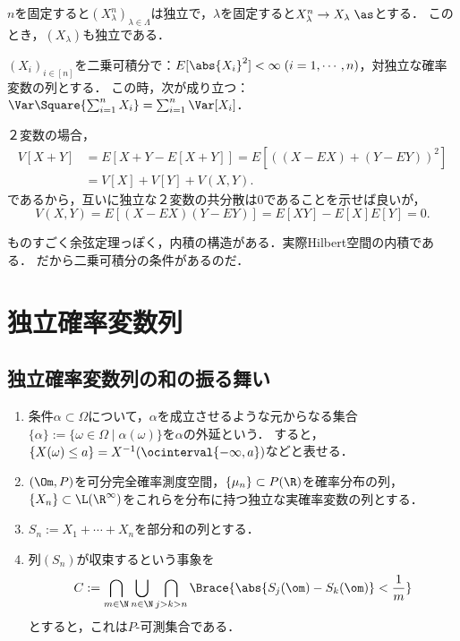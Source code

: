 \documentclass[uplatex,dvipdfmx]{jsreport}
\begin{document}
\begin{proposition}[概収束極限も独立]
    $n$を固定すると$(X_\lambda^{n})_{\lambda\in\Lambda}$は独立で，$\lambda$を固定すると$X_\lambda^n\to X_\lambda\;\as$とする．
    このとき，$(X_\lambda)$も独立である．
\end{proposition}


\begin{corollary}[分散が和を保つ条件]\label{cor-linearity-of-Var-on-independent-variables}
    $(X_i)_{i\in[n]}$を二乗可積分で：$E[\abs{X_i}^2]<\infty\;(i=1,\cdots,n)$，対独立な確率変数の列とする．
    この時，次が成り立つ：$\Var\Square{\sum^n_{i=1}X_i}=\sum^n_{i=1}\Var[X_i]$．
\end{corollary}
\begin{Proof}
    ２変数の場合，
    \begin{align*}
        V[X+Y]&=E[X+Y-E[X+Y]]=E[((X-EX)+(Y-EY))^2]\\
        &=V[X]+V[Y]+V(X,Y).
    \end{align*}
    であるから，互いに独立な２変数の共分散は$0$であることを示せば良いが，
    \[V(X,Y)=E[(X-EX)(Y-EY)]=E[XY]-E[X]E[Y]=0.\]
\end{Proof}
\begin{remarks}
    ものすごく余弦定理っぽく，内積の構造がある．実際Hilbert空間の内積である．
    だから二乗可積分の条件があるのだ．
\end{remarks}

\chapter{独立確率変数列}

\section{独立確率変数列の和の振る舞い}

\begin{notation}[extension]\mbox{}
    \begin{enumerate}
        \item 条件$\alpha\subset\Omega$について，$\alpha$を成立させるような元からなる集合$\{\alpha\}:=\{\omega\in\Omega\mid \alpha(\omega)\}$を$\alpha$の外延という．
        すると，$\{X(\omega)\le a\}=X^{-1}(\ocinterval{-\infty,a})$などと表せる．
        \item $(\Om,P)$を可分完全確率測度空間，$\{\mu_n\}\subset P(\R)$を確率分布の列，$\{X_n\}\subset\L(\R^\infty)$をこれらを分布に持つ独立な実確率変数の列とする．
        \item $S_n:=X_1+\cdots+X_n$を部分和の列とする．
        \item 列$(S_n)$が収束するという事象を
        \[C:=\bigcap_{m\in\N}\bigcup_{n\in\N}\bigcap_{j>k>n}\Brace{\abs{S_j(\om)-S_k(\om)}<\frac{1}{m}}\]
        とすると，これは$P$-可測集合である．
    \end{enumerate}
\end{notation}
\end{document}
